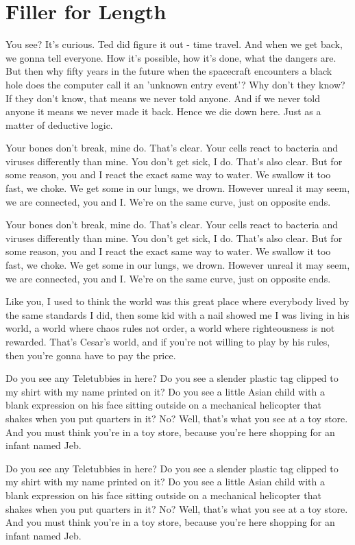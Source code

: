 \documentclass{book}
\begin{document}
\section{Filler for Length%
  \label{filler-for-length}%
}

You see? It's curious. Ted did figure it out - time travel. And when we get back, we gonna tell everyone. How it's possible, how it's done, what the dangers are. But then why fifty years in the future when the spacecraft encounters a black hole does the computer call it an 'unknown entry event'? Why don't they know? If they don't know, that means we never told anyone. And if we never told anyone it means we never made it back. Hence we die down here. Just as a matter of deductive logic.

Your bones don't break, mine do. That's clear. Your cells react to bacteria and viruses differently than mine. You don't get sick, I do. That's also clear. But for some reason, you and I react the exact same way to water. We swallow it too fast, we choke. We get some in our lungs, we drown. However unreal it may seem, we are connected, you and I. We're on the same curve, just on opposite ends.

Your bones don't break, mine do. That's clear. Your cells react to bacteria and viruses differently than mine. You don't get sick, I do. That's also clear. But for some reason, you and I react the exact same way to water. We swallow it too fast, we choke. We get some in our lungs, we drown. However unreal it may seem, we are connected, you and I. We're on the same curve, just on opposite ends.

Like you, I used to think the world was this great place where everybody lived by the same standards I did, then some kid with a nail showed me I was living in his world, a world where chaos rules not order, a world where righteousness is not rewarded. That's Cesar's world, and if you're not willing to play by his rules, then you're gonna have to pay the price.

Do you see any Teletubbies in here? Do you see a slender plastic tag clipped to my shirt with my name printed on it? Do you see a little Asian child with a blank expression on his face sitting outside on a mechanical helicopter that shakes when you put quarters in it? No? Well, that's what you see at a toy store. And you must think you're in a toy store, because you're here shopping for an infant named Jeb.

Do you see any Teletubbies in here? Do you see a slender plastic tag clipped to my shirt with my name printed on it? Do you see a little Asian child with a blank expression on his face sitting outside on a mechanical helicopter that shakes when you put quarters in it? No? Well, that's what you see at a toy store. And you must think you're in a toy store, because you're here shopping for an infant named Jeb.
\end{document}

